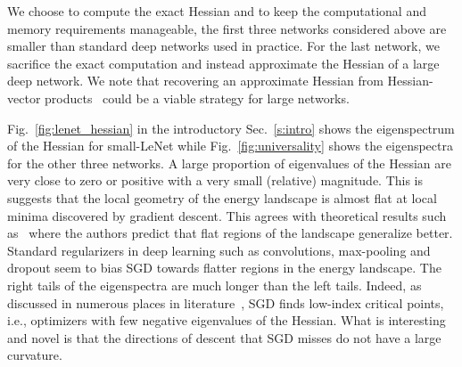 \documentclass[10pt]{article}
\begin{document}
We choose to compute the exact Hessian and to keep the computational and memory requirements manageable, the first three networks considered above are smaller than standard deep networks used in practice. For the last network, we sacrifice the exact computation and instead approximate the Hessian of a large deep network. We note that recovering an approximate Hessian from Hessian-vector products~\citep{pearlmutter1994fast} could be a viable strategy for large networks.

Fig.~\ref{fig:lenet_hessian} in the introductory Sec.~\ref{s:intro} shows the eigenspectrum of the Hessian for small-LeNet while Fig.~\ref{fig:universality} shows the eigenspectra for the other three networks.
%
A large proportion of eigenvalues of the Hessian are very close to zero or positive with a very small (relative) magnitude. This is suggests that the local geometry of the energy landscape is almost flat at local minima discovered by gradient descent. This agrees with theoretical results such as~\citet{baldassi2016local} where the authors predict that flat regions of the landscape generalize better. Standard regularizers in deep learning such as convolutions, max-pooling and dropout seem to bias SGD towards flatter regions in the energy landscape.
%
The right tails of the eigenspectra are much longer than the left tails. Indeed, as discussed in numerous places in literature~\citep{Bray2007,dauphin2014identifying,spinglass2015}, SGD finds low-index critical points, i.e., optimizers with few negative eigenvalues of the Hessian. What is interesting and novel is that the directions of descent that SGD misses do not have a large curvature.
\end{document}
